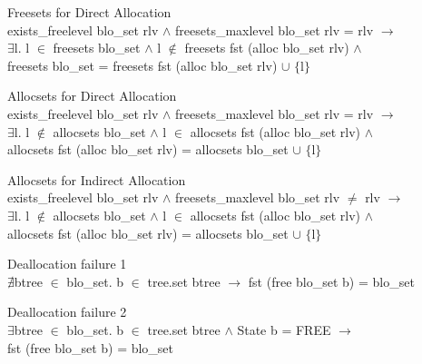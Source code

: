 \documentclass[runningheads]{llncs}
\begin{document}
\begin{definition} {Freesets for Direct Allocation} \\
exists\_freelevel blo\_set rlv $\wedge$ freesets\_maxlevel blo\_set rlv = rlv $\longrightarrow$ \\
\phantom{x} \hspace{10pt} $\exists$l. l $\in$ freesets blo\_set $\wedge$ l $\notin$ freesets fst (alloc blo\_set rlv) $\wedge$ \\
\phantom{x} \hspace{10pt} freesets blo\_set = freesets fst (alloc blo\_set rlv) $\cup$ $\lbrace$l$\rbrace$
\end{definition}

\begin{definition} {Allocsets for Direct Allocation} \\
exists\_freelevel blo\_set rlv $\wedge$ freesets\_maxlevel blo\_set rlv = rlv $\longrightarrow$ \\
\phantom{x} \hspace{10pt} $\exists$l. l $\notin$ allocsets blo\_set $\wedge$ l $\in$ allocsets fst (alloc blo\_set rlv) $\wedge$ \\
\phantom{x} \hspace{10pt} allocsets fst (alloc blo\_set rlv) = allocsets blo\_set $\cup$ $\lbrace$l$\rbrace$
\end{definition}

\begin{definition} {Allocsets for Indirect Allocation} \\
exists\_freelevel blo\_set rlv $\wedge$ freesets\_maxlevel blo\_set rlv $\neq$ rlv $\longrightarrow$ \\
\phantom{x} \hspace{10pt} $\exists$l. l $\notin$ allocsets blo\_set $\wedge$ l $\in$ allocsets fst (alloc blo\_set rlv) $\wedge$ \\
\phantom{x} \hspace{10pt} allocsets fst (alloc blo\_set rlv) = allocsets blo\_set $\cup$ $\lbrace$l$\rbrace$
\end{definition}

\begin{definition} {Deallocation failure 1} \\
$\nexists$btree $\in$ blo\_set. b $\in$ tree.set btree $\longrightarrow$ fst (free blo\_set b) = blo\_set
\end{definition}

\begin{definition} {Deallocation failure 2} \\
$\exists$btree $\in$ blo\_set. b $\in$ tree.set btree $\wedge$ State b = FREE $\longrightarrow$ \\
\phantom{x} \hspace{10pt} fst (free blo\_set b) = blo\_set
\end{definition}
\end{document}
